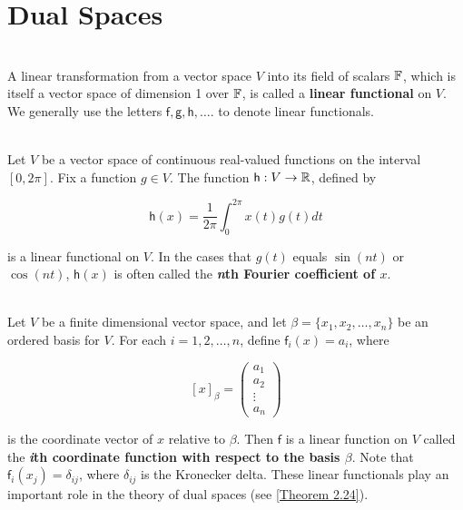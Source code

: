 \section{Dual Spaces}

\begin{definition}
	\hfill\\
	A linear transformation from a vector space $V$ into its field of scalars $\mathbb{F}$, which is itself a vector space of dimension 1 over $\mathbb{F}$, is called a \textbf{linear functional} on $V$. We generally use the letters $\mathsf{f}, \mathsf{g}, \mathsf{h}, \dots$. to denote linear functionals.
\end{definition}

\begin{definition}
	\hfill\\
	Let $V$ be a vector space of continuous real-valued functions on the interval $[0, 2\pi]$. Fix a function $g \in V$. The function $\mathsf{h}: V \to \mathbb{R}$, defined by
	
	\[\mathsf{h}(x) = \frac{1}{2\pi} \int_{0}^{2\pi}x(t)g(t) dt\]
	
	is a linear functional on $V$. In the cases that $g(t)$ equals $\sin(nt)$ or $\cos (nt)$, $\mathsf{h}(x)$ is often called the \textbf{\textit{n}th Fourier coefficient of $x$}.
\end{definition}

\begin{definition}
	\hfill\\
	Let $V$ be a finite dimensional vector space, and let $\beta = \{x_1, x_2, \dots, x_n\}$ be an ordered basis for $V$. For each $i = 1, 2, \dots, n$, define $\mathsf{f}_i(x) = a_i$, where
	
	\[[x]_\beta = \begin{pmatrix} a_1 \\ a_2 \\ \vdots \\ a_n \end{pmatrix}\]
	
	is the coordinate vector of $x$ relative to $\beta$. Then $\mathsf{f}$ is a linear function on $V$ called the \textbf{\textit{i}th coordinate function with respect to the basis $\beta$}. Note that $\mathsf{f}_i(x_j) = \delta_{ij}$, where $\delta_{ij}$ is the Kronecker delta. These linear functionals play an important role in the theory of dual spaces (see \autoref{Theorem 2.24}).
\end{definition}

